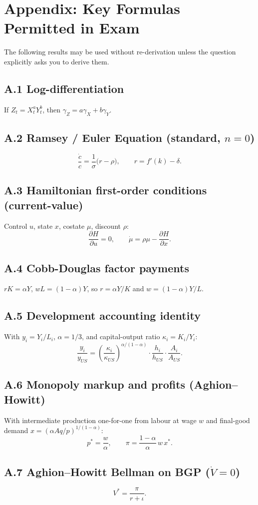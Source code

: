 \documentclass[a4paper,11pt]{article}
\begin{document}
\clearpage
\appendix
\section*{Appendix: Key Formulas Permitted in Exam}

The following results may be used without re-derivation unless the question explicitly
asks you to derive them.

\subsection*{A.1 \enspace Log-differentiation}
If $Z_t = X_t^a Y_t^b$, then $\gamma_Z = a\gamma_X + b\gamma_Y$.

\subsection*{A.2 \enspace Ramsey / Euler Equation (standard, $n=0$)}
\[
    \frac{\dot{c}}{c} = \frac{1}{\sigma}\bigl(r - \rho\bigr),
    \qquad r = f'(k) - \delta.
\]

\subsection*{A.3 \enspace Hamiltonian first-order conditions (current-value)}
Control $u$, state $x$, costate $\mu$, discount $\rho$:
\[
    \frac{\partial H}{\partial u} = 0, \qquad
    \dot{\mu} = \rho\mu - \frac{\partial H}{\partial x}.
\]

\subsection*{A.4 \enspace Cobb-Douglas factor payments}
$rK = \alpha Y$, $wL = (1-\alpha)Y$, so $r = \alpha Y/K$ and $w = (1-\alpha)Y/L$.

\subsection*{A.5 \enspace Development accounting identity}
With $y_i = Y_i/L_i$, $\alpha = 1/3$, and capital-output ratio $\kappa_i = K_i/Y_i$:
\[
    \frac{y_i}{y_{US}} = \left(\frac{\kappa_i}{\kappa_{US}}\right)^{\!\alpha/(1-\alpha)}
    \cdot \frac{h_i}{h_{US}}
    \cdot \frac{A_i}{A_{US}}.
\]

\subsection*{A.6 \enspace Monopoly markup and profits (Aghion--Howitt)}
With intermediate production one-for-one from labour at wage $w$ and final-good demand
$x = (\alpha A q / p)^{1/(1-\alpha)}$:
\[
    p^* = \frac{w}{\alpha}, \qquad
    \pi = \frac{1-\alpha}{\alpha}\,w\,x^*.
\]

\subsection*{A.7 \enspace Aghion--Howitt Bellman on BGP ($\dot{V}=0$)}
\[
    V^* = \frac{\pi}{r + \iota}.
\]
\end{document}
